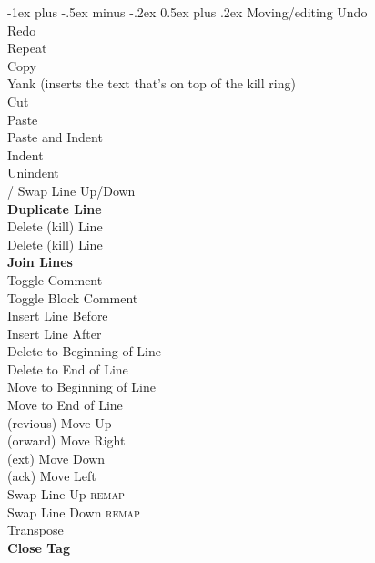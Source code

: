 \documentclass[10pt,landscape]{article}
\makeatletter
\renewcommand{\section}{\@startsection{section}{1}{0mm}%
                                {-1ex plus -.5ex minus -.2ex}%
                                {0.5ex plus .2ex}%
                                {\normalfont\large\bfseries}}
\makeatother
\begin{document}
\begin{multicols}{3}
\section{Moving/editing}
 Undo \\
 Redo \\
 Repeat \\
 Copy \\
 Yank (inserts the text that's on top of the kill ring)\\
 Cut \\
 Paste \\
 Paste and Indent \\
\keys{\cmd+]} Indent \\
\keys{\cmd+[} Unindent \\
\keys{\cmd+\ctrl+\arrowkeyup}/\keys{\arrowkeydown} Swap Line Up/Down \\
 \textbf{Duplicate Line} \\
 Delete (kill) Line \\
 Delete (kill) Line \\
 \textbf{Join Lines} \\
\keys{\cmd+/} Toggle Comment \\
\keys{\cmd+\Alt+/} Toggle Block Comment \\
\keys{\cmd+\shift+\return} Insert Line Before \\
\keys{\cmd+\return} Insert Line After \\
\keys{\cmd+\backspace} Delete to Beginning of Line \\
 Delete to End of Line \\
 Move to Beginning of Line \\
 Move to End of Line \\
(revious) Move Up \\
(orward) Move Right \\
(ext) Move Down \\
(ack) Move Left \\
 Swap Line Up \textsc{remap} \\
 Swap Line Down \textsc{remap} \\
 Transpose \\
 \textbf{Close Tag} \\

\end{multicols}
\end{document}
